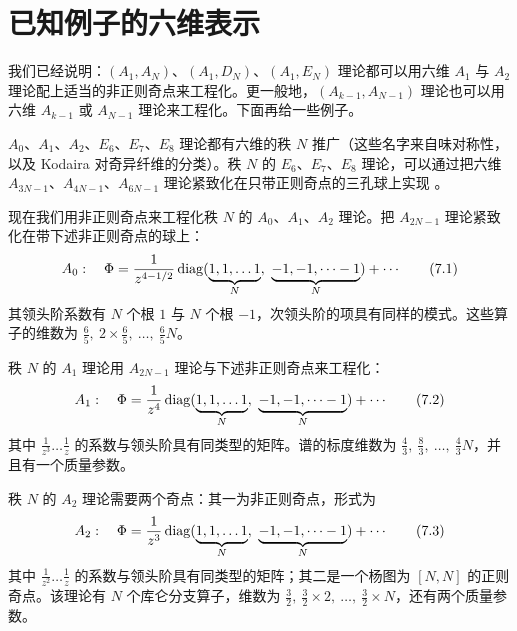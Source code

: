\section{已知例子的六维表示}
\label{sec:known}

我们已经说明：$(A_1,A_N)$、$(A_1,D_N)$、$(A_1,E_N)$ 理论都可以用六维 $A_1$ 与 $A_2$ 理论配上适当的非正则奇点来工程化。更一般地，$(A_{k-1},A_{N-1})$ 理论也可以用六维 $A_{k-1}$ 或 $A_{N-1}$ 理论来工程化。下面再给一些例子。

$A_0$、$A_1$、$A_2$、$E_6$、$E_7$、$E_8$ 理论都有六维的秩 $N$ 推广（这些名字来自味对称性，以及 Kodaira 对奇异纤维的分类）。秩 $N$ 的 $E_6$、$E_7$、$E_8$ 理论，可以通过把六维 $A_{3N-1}$、$A_{4N-1}$、$A_{6N-1}$ 理论紧致化在只带正则奇点的三孔球上实现 \cite{46}。

现在我们用非正则奇点来工程化秩 $N$ 的 $A_0$、$A_1$、$A_2$ 理论。把 $A_{2N-1}$ 理论紧致化在带下述非正则奇点的球上：
\begin{equation}
A_0:\quad \Phi = \frac{1}{z^{4-1/2}}\diag(\underbrace{1,1,\dots 1}_{N},\ \underbrace{-1,-1,\dots -1}_{N}) + \cdots
\label{eq:7.1}\tag{7.1}
\end{equation}
其领头阶系数有 $N$ 个根 $1$ 与 $N$ 个根 $-1$，次领头阶的项具有同样的模式。这些算子的维数为 $\tfrac{6}{5},\ 2\times\tfrac{6}{5},\ \dots,\ \tfrac{6}{5}N$。

秩 $N$ 的 $A_1$ 理论用 $A_{2N-1}$ 理论与下述非正则奇点来工程化：
\begin{equation}
A_1:\quad \Phi = \frac{1}{z^4}\diag(\underbrace{1,1,\dots 1}_{N},\ \underbrace{-1,-1,\dots -1}_{N}) + \cdots
\label{eq:7.2}\tag{7.2}
\end{equation}
其中 $\tfrac{1}{z^3}\dots\tfrac{1}{z}$ 的系数与领头阶具有同类型的矩阵。谱的标度维数为 $\tfrac{4}{3},\ \tfrac{8}{3},\ \dots,\ \tfrac{4}{3}N$，并且有一个质量参数。

秩 $N$ 的 $A_2$ 理论需要两个奇点：其一为非正则奇点，形式为
\begin{equation}
A_2:\quad \Phi = \frac{1}{z^3}\diag(\underbrace{1,1,\dots 1}_{N},\ \underbrace{-1,-1,\dots -1}_{N}) + \cdots
\label{eq:7.3}\tag{7.3}
\end{equation}
其中 $\tfrac{1}{z^2}\dots\tfrac{1}{z}$ 的系数与领头阶具有同类型的矩阵；其二是一个杨图为 $[N,N]$ 的正则奇点。该理论有 $N$ 个库仑分支算子，维数为 $\tfrac{3}{2},\ \tfrac{3}{2}\times 2,\ \dots,\ \tfrac{3}{2}\times N$，还有两个质量参数。


